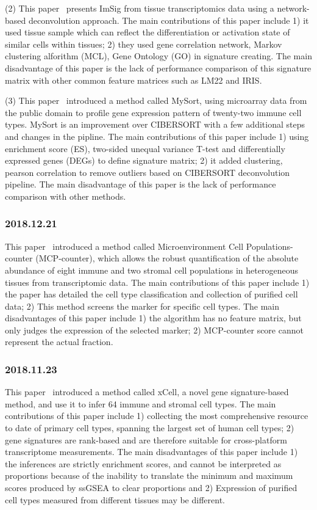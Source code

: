 \documentclass{article}
\begin{document}
(2) This paper~\cite{Nirmal1388} presents ImSig from tissue transcriptomics data using a network-based deconvolution approach. The main contributions of this paper include 1) it used tissue sample which can reflect the differentiation or activation state of similar cells within tissues; 2) they used gene correlation network, Markov clustering alforithm (MCL), Gene Ontology (GO) in signature creating. The main disadvantage of this paper is the lack of performance comparison of this signature matrix with other common feature matrices such as LM22 and IRIS.

(3) This paper~\cite{Chen2018} introduced a method called MySort, using microarray data from the public domain to profile gene expression pattern of twenty-two immune cell types. MySort is an improvement over CIBERSORT with a few additional steps and changes in the pipline. The main contributions of this paper include 1) using enrichment score (ES), two-sided unequal variance T-test and differentially expressed genes (DEGs) to define signature matrix; 2) it added clustering, pearson correlation to remove outliers based on CIBERSORT deconvolution pipeline. The main disadvantage of this paper is the lack of performance comparison with other methods.

\subsubsection{2018.12.21}
This paper~\cite{Etienne2016Estimating} introduced a method called Microenvironment Cell Populations-counter (MCP-counter), which allows the robust quantification of the absolute abundance of eight immune and two stromal cell populations in heterogeneous tissues from transcriptomic data. The main contributions of this paper include 1) the paper has detailed the cell type classification and collection of purified cell data; 2) This method screens the marker for specific cell types. The main disadvantages of this paper include 1) the algorithm has no feature matrix, but only judges the expression of the selected marker; 2) MCP-counter score cannot represent the actual fraction. 

\subsubsection{2018.11.23}
This paper~\cite{Aran2017xCell} introduced a method called xCell, a novel gene signature-based method, and use it to infer 64 immune and stromal cell types. The main contributions of this paper include 1) collecting the most comprehensive resource to date of primary cell types, spanning the largest set of human cell types; 2) gene signatures are rank-based and are therefore suitable for cross-platform transcriptome measurements. The main disadvantages of this paper include 1) the inferences are strictly enrichment scores, and cannot be interpreted as proportions because of the inability to translate the minimum and maximum scores produced by ssGSEA to clear proportions and 2) Expression of purified cell types measured from different tissues may be different.
\end{document}
